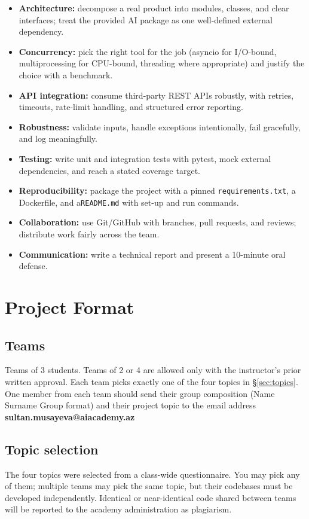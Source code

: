 \documentclass[11pt,a4paper]{article}
\begin{document}
\begin{itemize}[topsep=2pt,itemsep=1pt]
  \item \textbf{Architecture:} decompose a real product into modules, classes, and clear interfaces; treat the provided AI package as one well-defined external dependency.
  \item \textbf{Concurrency:} pick the right tool for the job (asyncio for I/O-bound, multiprocessing for CPU-bound, threading where appropriate) and justify the choice with a benchmark.
  \item \textbf{API integration:} consume third-party REST APIs robustly, with retries, timeouts, rate-limit handling, and structured error reporting.
  \item \textbf{Robustness:} validate inputs, handle exceptions intentionally, fail gracefully, and log meaningfully.
  \item \textbf{Testing:} write unit and integration tests with pytest, mock external dependencies, and reach a stated coverage target.
  \item \textbf{Reproducibility:} package the project with a pinned \texttt{requirements.txt}, a Dockerfile, and a\texttt{README.md} with set-up and run commands.
  \item \textbf{Collaboration:} use Git/GitHub with branches, pull requests, and reviews; distribute work fairly across the team.
  \item \textbf{Communication:} write a technical report and present a 10-minute oral defense.
\end{itemize}

\section{Project Format}

\subsection{Teams}
Teams of 3 students. Teams of 2 or 4 are allowed only with the instructor's prior written approval. Each team picks exactly one of the four topics in §\ref{sec:topics}. One member from each team should send their group composition (Name Surname Group format) and their project topic to the email address \textbf{sultan.musayeva@aiacademy.az}

\subsection{Topic selection}
The four topics were selected from a class-wide questionnaire. You may pick any of them; multiple teams may pick the same topic, but their codebases must be developed independently. Identical or near-identical code shared between teams will be reported to the academy administration as plagiarism.
\end{document}
